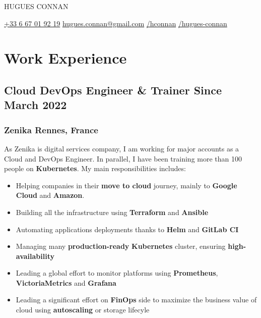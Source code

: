 \documentclass[11pt]{article}
\newcommand{\rside}[1]{
  \hfill {\normalfont\color{accent} #1}%
}
\begin{document}

\begin{center}
  {
    \fontsize{36}{12} 
    \selectfont
    \color{accent} 
    HUGUES CONNAN %
  } \\ \medskip


  \href{tel:+33667019219}{{\color{gray}{\faPhone}} +33 6 67 01 92 19} \quad
  \href{mailto:hugues.connan@gmail.com}{{\color{gray}{\faEnvelope}} hugues.connan@gmail.com} \quad 
  \href{https://github.com/hconnan}{{\color{gray}{\faGithub}} /hconnan} \quad
  \href{https://www.linkedin.com/in/hugues-connan}{{\color{gray}{\faLinkedin}} /hugues-connan} \quad
\end{center}


\section{Work Experience}
\subsection{Cloud DevOps Engineer \& Trainer \rside{Since March 2022}}
\subsubsection{Zenika \rside{Rennes, France}}

\begin{justify}
  As Zenika is digital services company, I am working for major accounts as a Cloud and DevOps Engineer.
  In parallel, I have been training more than 100 people on \textbf{Kubernetes}. My main responsibilities includes:
\end{justify}
\vspace{-3mm}

\begin{itemize}
  \item Helping companies in their \textbf{move to cloud} journey, mainly to \textbf{Google Cloud} and \textbf{Amazon}.
  \item Building all the infrastructure using \textbf{Terraform} and \textbf{Ansible}
  \item Automating applications deployments thanks to \textbf{Helm} and \textbf{GitLab CI}
  \item Managing many \textbf{production-ready} \textbf{Kubernetes} cluster, ensuring \textbf{high-availability}
  \item Leading a global effort to monitor platforms using \textbf{Prometheus}, \textbf{VictoriaMetrics} and \textbf{Grafana}
  \item Leading a significant effort on \textbf{FinOps} side to maximize the business value of cloud using \textbf{autoscaling} or storage lifecyle 
\end{itemize}
\end{document}
